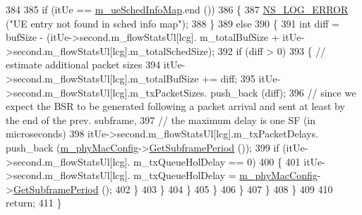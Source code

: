 \begin{DoxyCode}
384 
385                                         \textcolor{keywordflow}{if} (itUe == \hyperlink{classns3_1_1MmWaveFlexTtiMaxRateMacScheduler_ac8359b3799f29f5b49e0f2dd52acd0ab}{m\_ueSchedInfoMap}.end ())
386                                         \{
387                                                 \hyperlink{group__logging_ga0261a8db1d4ac5f79417d117634fd455}{NS\_LOG\_ERROR} (\textcolor{stringliteral}{"UE entry not found in sched info
       map"});
388                                         \}
389                                         \textcolor{keywordflow}{else}
390                                         \{
391                                                 \textcolor{keywordtype}{int} diff = bufSize - (itUe->second.m\_flowStatsUl[lcg].
      m\_totalBufSize + itUe->second.m\_flowStatsUl[lcg].m\_totalSchedSize);
392                                                 \textcolor{keywordflow}{if} (diff > 0)
393                                                 \{       \textcolor{comment}{// estimate additional packet sizes}
394                                                         itUe->second.m\_flowStatsUl[lcg].m\_totalBufSize += 
      diff;
395                                                         itUe->second.m\_flowStatsUl[lcg].m\_txPacketSizes.
      push\_back (diff);
396                                                         \textcolor{comment}{// since we expect the BSR to be generated
       following a packet arrival and sent at least by the end of the prev. subframe,}
397                                                         \textcolor{comment}{// the maximum delay is one SF (in microseconds)}
398                                                         itUe->second.m\_flowStatsUl[lcg].m\_txPacketDelays.
      push\_back (\hyperlink{classns3_1_1MmWaveMacScheduler_a24d7af4971d2e500fe543cefbafa2fd9}{m\_phyMacConfig}->\hyperlink{classns3_1_1MmWavePhyMacCommon_a1d402260d29c8931dd3dde73b295e23d}{GetSubframePeriod} ());
399                                                         \textcolor{keywordflow}{if} (itUe->second.m\_flowStatsUl[lcg].
      m\_txQueueHolDelay == 0)
400                                                         \{
401                                                                 itUe->second.m\_flowStatsUl[lcg].
      m\_txQueueHolDelay = \hyperlink{classns3_1_1MmWaveMacScheduler_a24d7af4971d2e500fe543cefbafa2fd9}{m\_phyMacConfig}->\hyperlink{classns3_1_1MmWavePhyMacCommon_a1d402260d29c8931dd3dde73b295e23d}{GetSubframePeriod} ();
402                                                         \}
403                                                 \}
404                                         \}
405                                 \}
406                         \}
407                 \}
408         \}
409 
410         \textcolor{keywordflow}{return};
411 \}
\end{DoxyCode}


